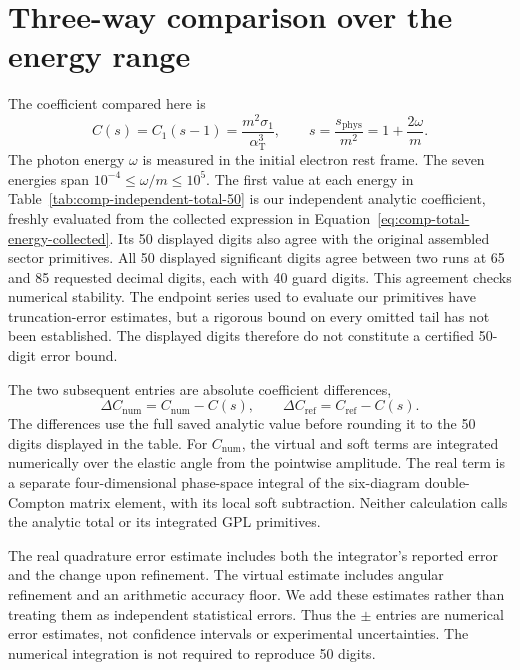 \section{Three-way comparison over the energy range}
\label{sec:comp-independent-total-comparison}
The coefficient compared here is
\begin{equation}
 C(s)=C_1(s-1)=\frac{m^2\sigma_1}{\alpha_{\mathrm T}^3},\qquad
 s=\frac{s_{\mathrm{phys}}}{m^2}=1+\frac{2\omega}{m}.
\end{equation}
The photon energy $\omega$ is measured in the initial electron rest
frame. The seven energies span $10^{-4}\leq\omega/m\leq10^5$.
The first value at each energy in
Table~\ref{tab:comp-independent-total-50} is our independent analytic
coefficient, freshly evaluated from the collected expression in
Equation~\eqref{eq:comp-total-energy-collected}. Its 50 displayed digits
also agree with the original assembled sector primitives.
All 50 displayed significant digits agree between two runs at
65 and 85 requested decimal digits, each with 40 guard digits.
This agreement checks numerical stability. The endpoint series used
to evaluate our primitives have truncation-error estimates, but a
rigorous bound on every omitted tail has not been established.
The displayed digits therefore do not constitute a certified
50-digit error bound.

The two subsequent entries are absolute coefficient differences,
\begin{equation}
 \Delta C_{\mathrm{num}}=C_{\mathrm{num}}-C(s),\qquad
 \Delta C_{\mathrm{ref}}=C_{\mathrm{ref}}-C(s).
\end{equation}
The differences use the full saved analytic value before rounding it
to the 50 digits displayed in the table.
For $C_{\mathrm{num}}$, the virtual and soft terms are integrated
numerically over the elastic angle from the pointwise amplitude.
The real term is a separate four-dimensional phase-space integral
of the six-diagram double-Compton matrix element, with its local
soft subtraction. Neither calculation calls the analytic total
or its integrated GPL primitives.

The real quadrature error estimate includes both the integrator's
reported error and the change upon refinement. The virtual estimate
includes angular refinement and an arithmetic accuracy floor.
We add these estimates rather than treating them as independent
statistical errors. Thus the $\pm$ entries are numerical error
estimates, not confidence intervals or experimental uncertainties.
The numerical integration is not required to reproduce 50 digits.

